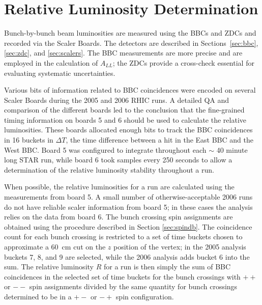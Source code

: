 \section{Relative Luminosity Determination}

Bunch-by-bunch beam luminosities are measured using the BBCs and ZDCs and
recorded via the Scaler Boards. The detectors are described in
Sections~\ref{sec:bbc}, \ref{sec:zdc}, and \ref{sec:scalers}. The BBC
measurements are more precise and are employed in the calculation of \(A_{LL}\);
the ZDCs provide a cross-check essential for evaluating systematic
uncertainties.

Various bits of information related to BBC coincidences were encoded on several
Scaler Boards during the 2005 and 2006 RHIC runs. A detailed QA and comparison
of the different boards led to the conclusion that the fine-grained timing
information on boards 5 and 6 should be used to calculate the relative
luminosities. These boards allocated enough bits to track the BBC coincidences
in 16 buckets in \(\Delta T\), the time difference between a hit in the East BBC
and the West BBC. Board 5 was configured to integrate throughout each \(\sim\)
40 minute long STAR run, while board 6 took samples every 250 seconds to allow a
determination of the relative luminosity stability throughout a run.

When possible, the relative luminosities for a run are calculated using the
measurements from board 5. A small number of otherwise-acceptable 2006 runs do
not have reliable scaler information from board 5; in these cases the analysis
relies on the data from board 6. The bunch crossing spin assignments are
obtained using the procedure described in Section \ref{sec:spindb}. The
coincidence count for each bunch crossing is restricted to a set of time buckets
chosen to approximate a 60~cm cut on the $z$ position of the vertex; in the 2005
analysis buckets 7, 8, and 9 are selected, while the 2006 analysis adds bucket 6
into the sum. The relative luminosity \(R\) for a run is then simply the sum of
BBC coincidences in the selected set of time buckets for the bunch crossings
with \(++\) or \(--\) spin assignments divided by the same quantity for bunch
crossings determined to be in a \(+-\) or \(-+\) spin configuration.





